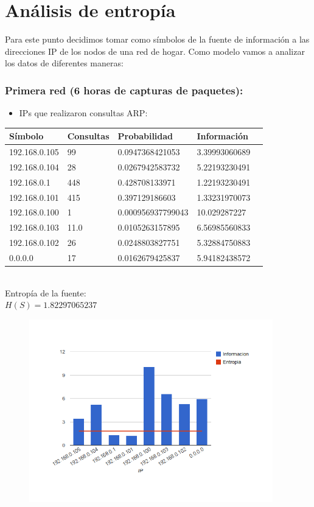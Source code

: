\section{An\'alisis de entrop\'ia}


\indent Para este punto decidimos tomar como s\'imbolos de la fuente de informaci\'on a las direcciones IP de los nodos de una red de hogar.
Como modelo vamos a analizar los datos de diferentes maneras:

\subsubsection{Primera red (6 horas de capturas de paquetes):}

\begin{itemize}
 \item  IPs que realizaron consultas ARP:
\end{itemize}

\begin{tabular}{|l|l|l|l|l|}
  \hline
  S\'imbolo & Consultas & Probabilidad & Informaci\'on \\
  \hline
  192.168.0.105 & 99 & 0.0947368421053 & 3.39993060689 \\
  \hline
  192.168.0.104 & 28 & 0.0267942583732 & 5.22193230491 \\
  \hline
  192.168.0.1 & 448 & 0.428708133971 & 1.22193230491 \\
  \hline
  192.168.0.101 & 415 & 0.397129186603  & 1.33231970073 \\
  \hline
  192.168.0.100 & 1 & 0.000956937799043 & 10.029287227 \\
  \hline
  192.168.0.103 & 11.0 & 0.0105263157895 & 6.56985560833 \\
  \hline
  192.168.0.102 & 26 & 0.0248803827751 & 5.32884750883 \\
  \hline
  0.0.0.0 & 17 & 0.0162679425837 & 5.94182438572 \\
  \hline
\end{tabular}\\


Entrop\'ia de la fuente:\\
$H(S) = 1.82297065237$\\

\begin{figure}[h]
  \centering                                                       
          \includegraphics[width=300pt]{consultas1.png}
\end{figure}


